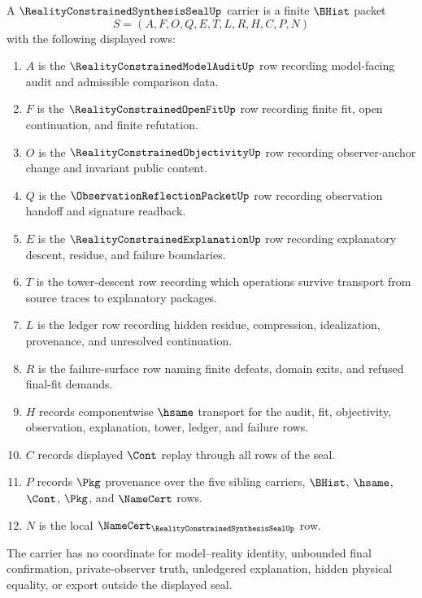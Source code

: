 \begin{definition}
\label{def:reality-constrained-synthesis-seal-carrier}
A $\RealityConstrainedSynthesisSealUp$ carrier is a finite $\BHist$ packet
$$
S=(A,F,O,Q,E,T,L,R,H,C,P,N)
$$
with the following displayed rows:
\begin{enumerate}
\item $A$ is the $\RealityConstrainedModelAuditUp$ row recording model-facing audit and admissible comparison data.
\item $F$ is the $\RealityConstrainedOpenFitUp$ row recording finite fit, open continuation, and finite refutation.
\item $O$ is the $\RealityConstrainedObjectivityUp$ row recording observer-anchor change and invariant public content.
\item $Q$ is the $\ObservationReflectionPacketUp$ row recording observation handoff and signature readback.
\item $E$ is the $\RealityConstrainedExplanationUp$ row recording explanatory descent, residue, and failure boundaries.
\item $T$ is the tower-descent row recording which operations survive transport from source traces to explanatory packages.
\item $L$ is the ledger row recording hidden residue, compression, idealization, provenance, and unresolved continuation.
\item $R$ is the failure-surface row naming finite defeats, domain exits, and refused final-fit demands.
\item $H$ records componentwise $\hsame$ transport for the audit, fit, objectivity, observation, explanation, tower, ledger, and failure rows.
\item $C$ records displayed $\Cont$ replay through all rows of the seal.
\item $P$ records $\Pkg$ provenance over the five sibling carriers, $\BHist$, $\hsame$, $\Cont$, $\Pkg$, and $\NameCert$ rows.
\item $N$ is the local $\NameCert_{\RealityConstrainedSynthesisSealUp}$ row.
\end{enumerate}
The carrier has no coordinate for model--reality identity, unbounded final confirmation, private-observer truth, unledgered explanation, hidden physical equality, or export outside the displayed seal.
\end{definition}

